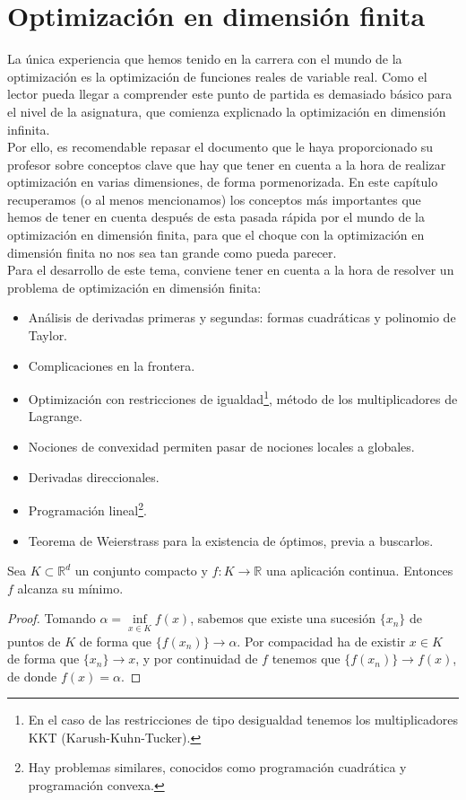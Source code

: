 \chapter{Optimización en dimensión finita}
\noindent
La única experiencia que hemos tenido en la carrera con el mundo de la optimización es la optimización de funciones reales de variable real. Como el lector pueda llegar a comprender este punto de partida es demasiado básico para el nivel de la asignatura, que comienza explicnado la optimización en dimensión infinita.\\

\noindent
Por ello, es recomendable repasar el documento que le haya proporcionado su profesor sobre conceptos clave que hay que tener en cuenta a la hora de realizar optimización en varias dimensiones, de forma pormenorizada. En este capítulo recuperamos (o al menos mencionamos) los conceptos más importantes que hemos de tener en cuenta después de esta pasada rápida por el mundo de la optimización en dimensión finita, para que el choque con la optimización en dimensión finita no nos sea tan grande como pueda parecer.\\

\noindent
Para el desarrollo de este tema, conviene tener en cuenta a la hora de resolver un problema de optimización en dimensión finita: %
\begin{itemize}
    \item Análisis de derivadas primeras y segundas: formas cuadráticas y polinomio de Taylor.
    \item Complicaciones en la frontera.
    \item Optimización con restricciones de igualdad\footnote{En el caso de las restricciones de tipo desigualdad tenemos los multiplicadores KKT (Karush-Kuhn-Tucker).}, método de los multiplicadores de Lagrange.
    \item Nociones de convexidad permiten pasar de nociones locales a globales.
    \item Derivadas direccionales.
    \item Programación lineal\footnote{Hay problemas similares, conocidos como programación cuadrática y programación convexa.}.
    \item Teorema de Weierstrass para la existencia de óptimos, previa a buscarlos.
\end{itemize}

\begin{teo}[de Weierstrass]
    Sea $K\subset \mathbb{R}^d$ un conjunto compacto y $f:K\to \mathbb{R}$ una aplicación continua. Entonces $f$ alcanza su mínimo.
    \begin{proof}
        Tomando $\alpha = \inf\limits_{x\in K}f(x)$, sabemos que existe una sucesión $\{x_n\}$ de puntos de $K$ de forma que $\{f(x_n)\}\to \alpha$. Por compacidad ha de existir $x\in K$ de forma que $\{x_n\}\to x$, y por continuidad de $f$ tenemos que $\{f(x_n)\}\to f(x)$, de donde $f(x) = \alpha$.
    \end{proof}
\end{teo}

